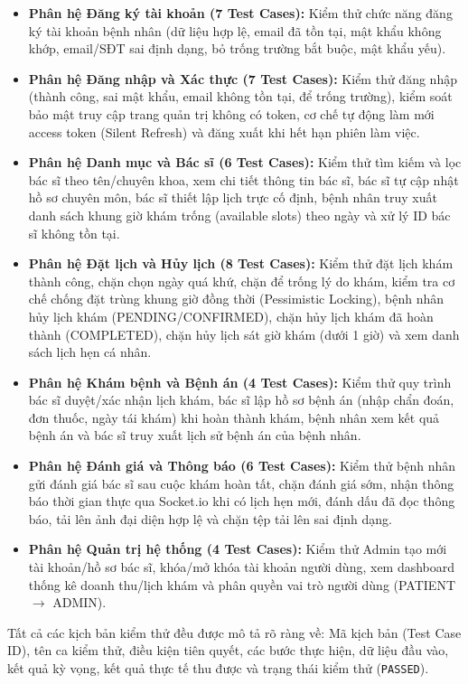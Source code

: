 \documentclass[12pt,a4paper]{report}
\begin{document}
\begin{itemize}
    \item \textbf{Phân hệ Đăng ký tài khoản (7 Test Cases):} Kiểm thử chức năng đăng ký tài khoản bệnh nhân (dữ liệu hợp lệ, email đã tồn tại, mật khẩu không khớp, email/SĐT sai định dạng, bỏ trống trường bắt buộc, mật khẩu yếu).
    
    \item \textbf{Phân hệ Đăng nhập và Xác thực (7 Test Cases):} Kiểm thử đăng nhập (thành công, sai mật khẩu, email không tồn tại, để trống trường), kiểm soát bảo mật truy cập trang quản trị không có token, cơ chế tự động làm mới access token (Silent Refresh) và đăng xuất khi hết hạn phiên làm việc.
    
    \item \textbf{Phân hệ Danh mục và Bác sĩ (6 Test Cases):} Kiểm thử tìm kiếm và lọc bác sĩ theo tên/chuyên khoa, xem chi tiết thông tin bác sĩ, bác sĩ tự cập nhật hồ sơ chuyên môn, bác sĩ thiết lập lịch trực cố định, bệnh nhân truy xuất danh sách khung giờ khám trống (available slots) theo ngày và xử lý ID bác sĩ không tồn tại.
    
    \item \textbf{Phân hệ Đặt lịch và Hủy lịch (8 Test Cases):} Kiểm thử đặt lịch khám thành công, chặn chọn ngày quá khứ, chặn để trống lý do khám, kiểm tra cơ chế chống đặt trùng khung giờ đồng thời (Pessimistic Locking), bệnh nhân hủy lịch khám (PENDING/CONFIRMED), chặn hủy lịch khám đã hoàn thành (COMPLETED), chặn hủy lịch sát giờ khám (dưới 1 giờ) và xem danh sách lịch hẹn cá nhân.
    
    \item \textbf{Phân hệ Khám bệnh và Bệnh án (4 Test Cases):} Kiểm thử quy trình bác sĩ duyệt/xác nhận lịch khám, bác sĩ lập hồ sơ bệnh án (nhập chẩn đoán, đơn thuốc, ngày tái khám) khi hoàn thành khám, bệnh nhân xem kết quả bệnh án và bác sĩ truy xuất lịch sử bệnh án của bệnh nhân.
    
    \item \textbf{Phân hệ Đánh giá và Thông báo (6 Test Cases):} Kiểm thử bệnh nhân gửi đánh giá bác sĩ sau cuộc khám hoàn tất, chặn đánh giá sớm, nhận thông báo thời gian thực qua Socket.io khi có lịch hẹn mới, đánh dấu đã đọc thông báo, tải lên ảnh đại diện hợp lệ và chặn tệp tải lên sai định dạng.
    
    \item \textbf{Phân hệ Quản trị hệ thống (4 Test Cases):} Kiểm thử Admin tạo mới tài khoản/hồ sơ bác sĩ, khóa/mở khóa tài khoản người dùng, xem dashboard thống kê doanh thu/lịch khám và phân quyền vai trò người dùng (PATIENT $\rightarrow$ ADMIN).
\end{itemize}
Tất cả các kịch bản kiểm thử đều được mô tả rõ ràng về: Mã kịch bản (Test Case ID), tên ca kiểm thử, điều kiện tiên quyết, các bước thực hiện, dữ liệu đầu vào, kết quả kỳ vọng, kết quả thực tế thu được và trạng thái kiểm thử (\texttt{PASSED}).
\end{document}
